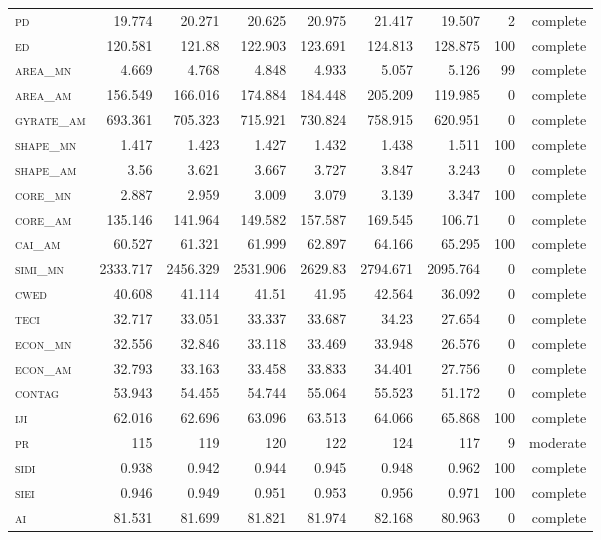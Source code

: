 \begin{landscape}
\begin{table}[htbp]
\begin{tabular}{@{}lrrrrr|rrr@{}}
\textsc{pd        } & 19.774   & 20.271   & 20.625   & 20.975   & 21.417   & 19.507   & 2   & complete  \\ 
\textsc{ed        } & 120.581  & 121.88   & 122.903  & 123.691  & 124.813  & 128.875  & 100 & complete  \\
\textsc{area\_mn  } & 4.669    & 4.768    & 4.848    & 4.933    & 5.057    & 5.126    & 99  & complete   \\
\textsc{area\_am  } & 156.549  & 166.016  & 174.884  & 184.448  & 205.209  & 119.985  & 0   & complete \\
\textsc{gyrate\_am} & 693.361  & 705.323  & 715.921  & 730.824  & 758.915  & 620.951  & 0   & complete \\
\textsc{shape\_mn } & 1.417    & 1.423    & 1.427    & 1.432    & 1.438    & 1.511    & 100 & complete  \\
\textsc{shape\_am } & 3.56     & 3.621    & 3.667    & 3.727    & 3.847    & 3.243    & 0   & complete \\
\textsc{core\_mn  } & 2.887    & 2.959    & 3.009    & 3.079    & 3.139    & 3.347    & 100 & complete  \\
\textsc{core\_am  } & 135.146  & 141.964  & 149.582  & 157.587  & 169.545  & 106.71   & 0   & complete \\
\textsc{cai\_am   } & 60.527   & 61.321   & 61.999   & 62.897   & 64.166   & 65.295   & 100 & complete  \\
\textsc{simi\_mn  } & 2333.717 & 2456.329 & 2531.906 & 2629.83  & 2794.671 & 2095.764 & 0   & complete \\
\textsc{cwed      } & 40.608   & 41.114   & 41.51    & 41.95    & 42.564   & 36.092   & 0   & complete \\
\textsc{teci      } & 32.717   & 33.051   & 33.337   & 33.687   & 34.23    & 27.654   & 0   & complete \\
\textsc{econ\_mn  } & 32.556   & 32.846   & 33.118   & 33.469   & 33.948   & 26.576   & 0   & complete \\
\textsc{econ\_am  } & 32.793   & 33.163   & 33.458   & 33.833   & 34.401   & 27.756   & 0   & complete \\
\textsc{contag    } & 53.943   & 54.455   & 54.744   & 55.064   & 55.523   & 51.172   & 0   & complete \\
\textsc{iji       } & 62.016   & 62.696   & 63.096   & 63.513   & 64.066   & 65.868   & 100 & complete  \\
\textsc{pr        } & 115      & 119      & 120      & 122      & 124      & 117      & 9   & moderate  \\
\textsc{sidi      } & 0.938    & 0.942    & 0.944    & 0.945    & 0.948    & 0.962    & 100 & complete  \\
\textsc{siei      } & 0.946    & 0.949    & 0.951    & 0.953    & 0.956    & 0.971    & 100 & complete  \\
\textsc{ai        } & 81.531   & 81.699   & 81.821   & 81.974   & 82.168   & 80.963   & 0   & complete \\ \bottomrule
\end{tabular}
\end{table}
\end{landscape}